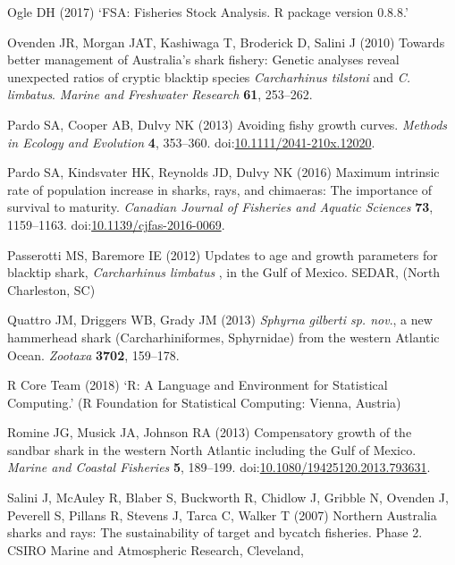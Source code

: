 \documentclass[]{article}
\begin{document}
\hypertarget{ref-ogle_fsa:_2017}{}
Ogle DH (2017) `FSA: Fisheries Stock Analysis. R package version 0.8.8.'

\hypertarget{ref-ovenden_towards_2010}{}
Ovenden JR, Morgan JAT, Kashiwaga T, Broderick D, Salini J (2010)
Towards better management of Australia's shark fishery: Genetic analyses
reveal unexpected ratios of cryptic blacktip species \emph{Carcharhinus
tilstoni} and \emph{C. limbatus}. \emph{Marine and Freshwater Research}
\textbf{61}, 253--262.

\hypertarget{ref-pardo_avoiding_2013}{}
Pardo SA, Cooper AB, Dulvy NK (2013) Avoiding fishy growth curves.
\emph{Methods in Ecology and Evolution} \textbf{4}, 353--360.
doi:\href{https://doi.org/10.1111/2041-210x.12020}{10.1111/2041-210x.12020}.

\hypertarget{ref-pardo_maximum_2016}{}
Pardo SA, Kindsvater HK, Reynolds JD, Dulvy NK (2016) Maximum intrinsic
rate of population increase in sharks, rays, and chimaeras: The
importance of survival to maturity. \emph{Canadian Journal of Fisheries
and Aquatic Sciences} \textbf{73}, 1159--1163.
doi:\href{https://doi.org/10.1139/cjfas-2016-0069}{10.1139/cjfas-2016-0069}.

\hypertarget{ref-passerotti_updates_2012}{}
Passerotti MS, Baremore IE (2012) Updates to age and growth parameters
for blacktip shark, \emph{Carcharhinus limbatus} , in the Gulf of
Mexico. SEDAR, (North Charleston, SC)

\hypertarget{ref-quattro_sphyrna_2013}{}
Quattro JM, Driggers WB, Grady JM (2013) \emph{Sphyrna gilberti sp.
nov}., a new hammerhead shark (Carcharhiniformes, Sphyrnidae) from the
western Atlantic Ocean. \emph{Zootaxa} \textbf{3702}, 159--178.

\hypertarget{ref-rcoreteam_r:_2018}{}
R Core Team (2018) `R: A Language and Environment for Statistical
Computing.' (R Foundation for Statistical Computing: Vienna, Austria)

\hypertarget{ref-romine_compensatory_2013}{}
Romine JG, Musick JA, Johnson RA (2013) Compensatory growth of the
sandbar shark in the western North Atlantic including the Gulf of
Mexico. \emph{Marine and Coastal Fisheries} \textbf{5}, 189--199.
doi:\href{https://doi.org/10.1080/19425120.2013.793631}{10.1080/19425120.2013.793631}.

\hypertarget{ref-salini_northern_2007}{}
Salini J, McAuley R, Blaber S, Buckworth R, Chidlow J, Gribble N,
Ovenden J, Peverell S, Pillans R, Stevens J, Tarca C, Walker T (2007)
Northern Australia sharks and rays: The sustainability of target and
bycatch fisheries. Phase 2. CSIRO Marine and Atmospheric Research,
Cleveland,
\end{document}
